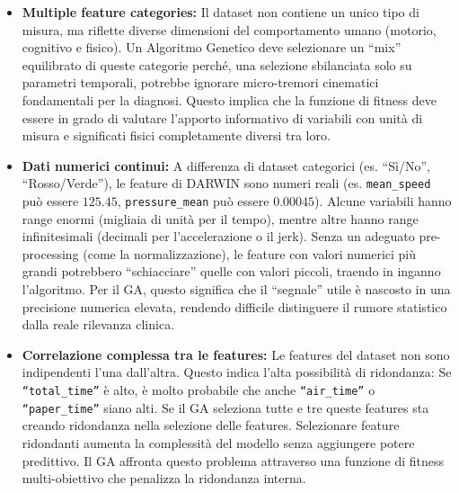 \documentclass[11pt,a4paper]{article}
\begin{document}
\begin{itemize}
  \item \textbf{Multiple feature categories:} Il dataset non contiene un unico tipo di misura, ma riflette diverse dimensioni del comportamento umano (motorio, cognitivo e fisico).
  Un Algoritmo Genetico deve selezionare un ``mix'' equilibrato di queste categorie perché, una selezione sbilanciata solo su parametri temporali, potrebbe ignorare micro-tremori cinematici fondamentali per la diagnosi.
  Questo implica che la funzione di fitness deve essere in grado di valutare l'apporto informativo di variabili con unità di misura e significati fisici completamente diversi tra loro.
  \item \textbf{Dati numerici continui:} A differenza di dataset categorici (es. ``Sì/No'', ``Rosso/Verde''), le feature di DARWIN sono numeri reali (es. \texttt{mean\_speed} può essere $125.45$, \texttt{pressure\_mean} può essere $0.00045$).
  Alcune variabili hanno range enormi (migliaia di unità per il tempo), mentre altre hanno range infinitesimali (decimali per l'accelerazione o il jerk). Senza un adeguato pre-processing (come la normalizzazione), le feature con valori numerici più grandi potrebbero ``schiacciare'' quelle con valori piccoli, traendo in inganno l'algoritmo.  
  Per il GA, questo significa che il ``segnale'' utile è nascosto in una precisione numerica elevata, rendendo difficile distinguere il rumore statistico dalla reale rilevanza clinica.
 \item \textbf{Correlazione complessa tra le features:} Le features del dataset non sono indipendenti l'una dall'altra. Questo indica l'alta possibilità di ridondanza:
  Se \texttt{``total\_time''} è alto, è molto probabile che anche \texttt{``air\_time''} o \texttt{``paper\_time''} siano alti. Se il GA seleziona tutte e tre queste features sta creando ridondanza nella selezione delle features.
  Selezionare feature ridondanti aumenta la complessità del modello senza aggiungere potere predittivo. Il GA affronta questo problema attraverso una funzione di fitness multi-obiettivo che penalizza la ridondanza interna.
\end{itemize}
\end{document}
